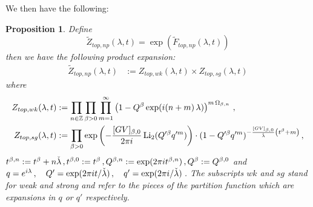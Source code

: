 \documentclass[a4paper,12pt,justification=centering]{article}
\numberwithin{equation}{section}
\newcommand{\ii}{\textnormal{i}}
\theoremstyle{plain}%
\newtheorem{prop}[thm]{Proposition}
\theoremstyle{definition}
\begin{document}
We then have the following:
\begin{prop}
Define $$\tilde{Z}_{top,np}(\lambda,t)= \exp\left( \tilde{F}_{top,np}(\lambda,t) \right)$$
then we have the following product expansion:
\begin{align}
\tilde{Z}_{top,np}(\lambda,t)&:=  Z_{top,wk}(\lambda,t) \times Z_{top,sg}(\lambda,t)
\end{align}
where
\begin{align}
 Z_{top,wk}(\lambda,t)&:= \prod_{n\in \mathbb{Z}}  \prod_{\beta>0}  \prod_{m=1}^{\infty}   \left(1-   Q^{\beta}   \exp(\ii (n+m) \,\lambda) \right)^{m\, \Omega_{\beta,n}}\,,\\
 Z_{top,sg}(\lambda,t) &:=   \prod_{\beta>0} \exp\left(-\frac{[\textrm{GV}]_{\beta,0}}{2\pi i} \operatorname{Li}_2(Q'^{\beta} q'^m)\right) \cdot (1-Q'^{\beta} q'^m)^{-\frac{ [\textrm{GV}]_{\beta,0}}{\check{\lambda}}\left( t^{\beta}+m\right)}\,,
\end{align}
$t^{\beta,n}:=t^{\beta}+ n \check{\lambda}\,, t^{\beta,0}:=t^{\beta}\, , Q^{\beta,n}:=\exp(2\pi \ii t^{\beta,n})\,, Q^{\beta}:=Q^{\beta,0}$
and $q=e^{\ii\lambda}\,, \quad Q'=\exp(2\pi i t/\check{\lambda})\,, \quad q'=\exp(2\pi i/\check{\lambda})$\,. The subscripts $wk$ and $sg$ stand for weak and strong and refer to the pieces of the partition function which are expansions in $q$ or $q'$ respectively.


\end{prop}
\end{document}
